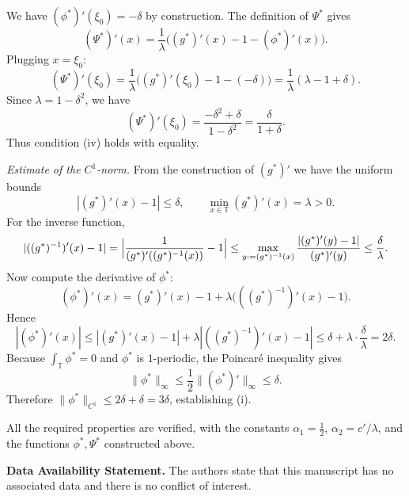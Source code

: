 \documentclass{amsart}
\newcommand{\T}{\mathbb{T}}
\begin{document}
		
		We have $\left(\phi^*\right)'(\xi_0)=-\delta$ by construction. The definition of $\Psi^*$ gives
		\[
		\left(\Psi^*\right)'(x) = \frac{1}{\lambda}\bigl((g^*)'(x)-1-(\phi^*)'(x)\bigr).
		\]
		Plugging $x=\xi_0$:
		\[
		\left(\Psi^*\right)'(\xi_0) = \frac{1}{\lambda}\bigl((g^*)'(\xi_0)-1-(-\delta)\bigr)
		= \frac{1}{\lambda}(\lambda-1+\delta).
		\]
		Since $\lambda=1-\delta^2$, we have
		\[
		\left(\Psi^*\right)'(\xi_0) = \frac{-\delta^2+\delta}{1-\delta^2}=\frac{\delta}{1+\delta}.
		\]
		Thus condition (iv) holds with equality.
		
		\vspace{1ex}
		
		\noindent\textit{Estimate of the $C^1$-norm.}
		From the construction of $(g^*)'$ we have the uniform bounds
		\[
		|(g^*)'(x)-1|\le \delta,\qquad \min_{x\in\mathbb{T}} (g^*)'(x)=\lambda>0.
		\]
		For the inverse function,
		\[
		|((g^*)^{-1})'(x)-1|
		= \Bigl|\frac{1}{(g^*)'((g^*)^{-1}(x))}-1\Bigr|
		\le \max_{y:=(g^*)^{-1}(x)}\frac{|(g^*)'(y)-1|}{(g^*)'(y)}
		\le \frac{\delta}{\lambda}.
		\]
		Now compute the derivative of $\phi^*$:
		\[
		\left(\phi^*\right)'(x) = (g^*)'(x)-1 + \lambda\bigl(((g^*)^{-1})'(x)-1\bigr).
		\]
		Hence
		\[
		|(\phi^*)'(x)| \le |(g^*)'(x)-1| + \lambda|((g^*)^{-1})'(x)-1|
		\le \delta + \lambda\cdot\frac{\delta}{\lambda}=2\delta.
		\]
		Because $\int_{\T}\phi^*=0$ and $\phi^*$ is $1$-periodic, the Poincar\'e inequality gives
		\[
		\|\phi^*\|_{\infty}\le \frac12\|\left(\phi^*\right)'\|_{\infty}\le\delta.
		\]
		Therefore $\|\phi^*\|_{C^1}\le 2\delta+\delta=3\delta$, establishing (i).
		
		All the required properties are verified, with the constants
		$\alpha_1=\frac12$, $\alpha_2=c'/\lambda$, and the functions $\phi^*,\Psi^*$
		constructed above.
		
		
		
		
		
		
		\vspace{2em}
		
		
		
		
		\noindent\textbf{Data Availability Statement.}
		The authors state that this manuscript has no associated data and there is no conflict of interest.
		
		
		
		
		
		
		
		
		
		
		
		
		
\end{document}
